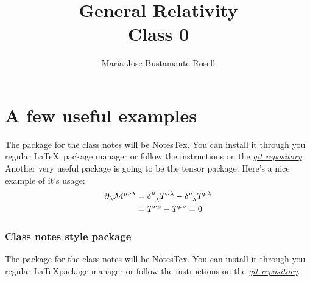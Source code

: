 \documentclass[10pt]{article}
\title{{\Huge General Relativity}\\{\Large{Class 0}}} %
\author{Maria Jose Bustamante Rosell}
\begin{document}
  \maketitle
  \flushbottom
  \newpage
  \pagestyle{fancynotes}
  \part{A few useful examples}
  The package for the class notes will be NotesTex. You can install it through you regular \LaTeX\, package manager or follow the instructions on the \href{https://github.com/Adhumunt/NotesTeX}{\textit{git repository}}.
  Another very useful package is going to be the tensor package. Here's a nice example of it's usage:
    \begin{align*}
	\partial_\lambda \tensor{\mathcal{M}}{^\mu^\nu^\lambda} &= \tensor{\delta}{^\mu_\lambda} T^{\nu \lambda}-\tensor{\delta}{^\nu_\lambda} T^{\mu \lambda}\\
        &= T^{\nu\mu}-T^{\mu\nu} =0
    \end{align*}
  \section{Class notes style package}
  The package for the class notes will be NotesTex. You can install it through you regular \LaTeX package manager or follow the instructions on the \href{https://github.com/Adhumunt/NotesTeX}{\textit{git repository}}.
\end{document}
